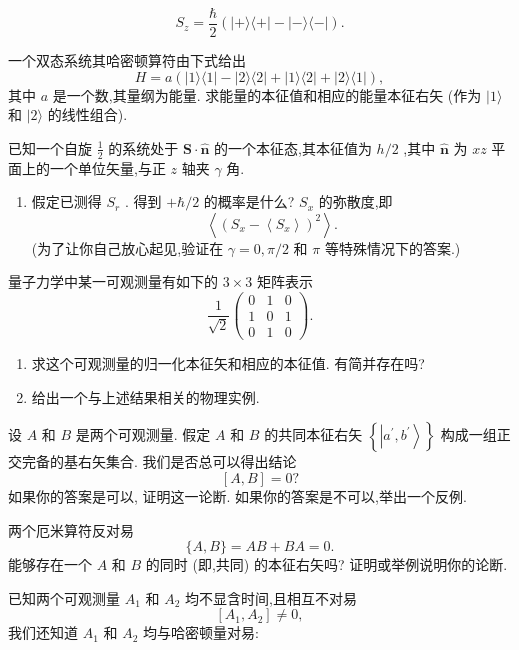 \begin{problemset}
$$	$$
	$$
	{S}_{z} = \frac{\hbar }{2}\left( {\left| {+\rangle \langle + }\right| - \left| {-\rangle \langle - }\right| }\right) .
	$$
	\item 一个双态系统其哈密顿算符由下式给出
	$$
	H = a\left( {\left| {1\rangle \langle 1}\right| - \left| {2\rangle \langle 2}\right| + \left| {1\rangle \langle 2}\right| + \left| {2\rangle \langle 1}\right| }\right) ,
	$$
	其中 $a$ 是一个数,其量纲为能量. 求能量的本征值和相应的能量本征右矢 (作为 $|1\rangle$ 和 $|2\rangle$ 的线性组合).
	\item 已知一个自旋 $\frac{1}{2}$ 的系统处于 $\mathbf{S} \cdot \widehat{\mathbf{n}}$ 的一个本征态,其本征值为 $h/2$ ,其中 $\widehat{\mathbf{n}}$ 为 ${xz}$ 平面上的一个单位矢量,与正 $z$ 轴夹 $\gamma$ 角.
	\begin{enumerate}
		\item 假定已测得 ${S}_{r}$ . 得到 $+ \hbar /2$ 的概率是什么?
		 ${S}_{x}$ 的弥散度,即
		$$
		\left\langle {\left( {S}_{x} - \left\langle {S}_{x}\right\rangle \right) }^{2}\right\rangle \text{.}
		$$
		(为了让你自己放心起见,验证在 $\gamma = 0,\pi /2$ 和 $\pi$ 等特殊情况下的答案.)
	\end{enumerate}
	\item 量子力学中某一可观测量有如下的 $3 \times 3$ 矩阵表示
	$$
	\frac{1}{\sqrt{2}}\left( \begin{array}{lll} 0 & 1 & 0 \\ 1 & 0 & 1 \\ 0 & 1 & 0 \end{array}\right) .
	$$
	\begin{enumerate}
		\item 求这个可观测量的归一化本征矢和相应的本征值. 有简并存在吗?
		\item 给出一个与上述结果相关的物理实例.
	\end{enumerate}
	\item 设 $A$ 和 $B$ 是两个可观测量. 假定 $A$ 和 $B$ 的共同本征右矢 $\left\{ \left| {{a}^{\prime },{b}^{\prime }}\right\rangle \right\}$ 构成一组正交完备的基右矢集合. 我们是否总可以得出结论
	$$
	\left\lbrack {A, B}\right\rbrack = 0?
	$$
	如果你的答案是可以, 证明这一论断. 如果你的答案是不可以,举出一个反例.
	\item 两个厄米算符反对易
	$$
	\{ A, B\} = {AB} + {BA} = 0.
	$$
	能够存在一个 $A$ 和 $B$ 的同时 (即,共同) 的本征右矢吗? 证明或举例说明你的论断.
	\item 已知两个可观测量 ${A}_{1}$ 和 ${A}_{2}$ 均不显含时间,且相互不对易
	$$
	\left\lbrack {{A}_{1},{A}_{2}}\right\rbrack \neq 0,
	$$
	我们还知道 ${A}_{1}$ 和 ${A}_{2}$ 均与哈密顿量对易:

\end{problemset}
